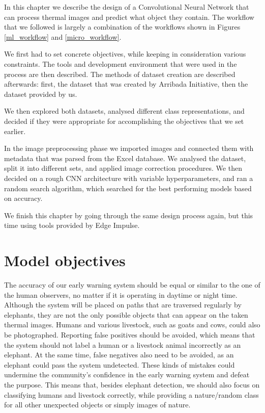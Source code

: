 In this chapter we describe the design of a Convolutional Neural Network that can process thermal images and predict what object they contain.
The workflow that we followed is largely a combination of the workflows shown in Figures \ref{ml_workflow} and \ref{micro_workflow}.

We first had to set concrete objectives, while keeping in consideration various constraints.
The tools and development environment that were used in the process are then described. 
The methods of dataset creation are described afterwards: first, the dataset that was created by Arribada Initiative, then the dataset provided by us. 

We then explored both datasets, analysed different class representations, and decided if they were appropriate for accomplishing the objectives that we set earlier.

In the image preprocessing phase we imported images and connected them with metadata that was parsed from the Excel database.
We analysed the dataset, split it into different sets, and applied image correction procedures.
We then decided on a rough CNN architecture with variable hyperparameters, and ran a random search algorithm, which searched for the best performing models based on accuracy.

We finish this chapter by going through the same design process again, but this time using tools provided by Edge Impulse.
\clearpage

\section{ Model objectives}\label{model_obj}

The accuracy of our early warning system should be equal or similar to the one of the human observers, no matter if it is operating in daytime or night time.
Although the system will be placed on paths that are traversed regularly by elephants, they are not the only possible objects that can appear on the taken thermal images.
Humans and various livestock, such as goats and cows, could also be photographed.
Reporting false positives should be avoided, which means that the system should not label a human or a livestock animal incorrectly as an elephant.
At the same time, false negatives also need to be avoided, as an elephant could pass the system undetected.
These kinds of mistakes could undermine the community's confidence in the early warning system and defeat the purpose.
This means that, besides elephant detection, we should also focus on classifying humans and livestock correctly, while providing a nature/random class for all other unexpected objects or simply images of nature.

